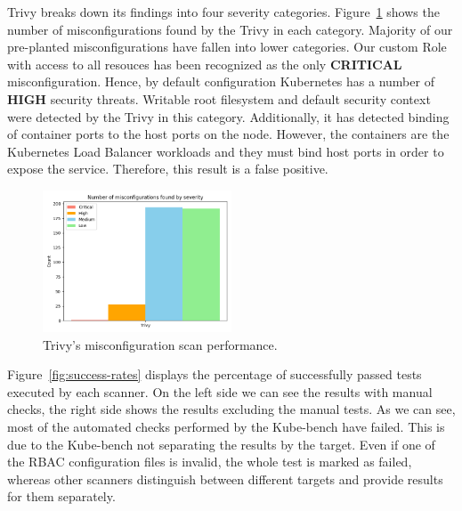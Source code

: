 
Trivy breaks down its findings into four severity categories. Figure~\ref{img:trivy-misconfigurations} shows the number of misconfigurations found by the Trivy in each category. Majority of our pre-planted misconfigurations have fallen into lower categories. Our custom Role with access to all resouces has been recognized as the only \textbf{CRITICAL} misconfiguration. Hence, by default configuration Kubernetes has a number of \textbf{HIGH} security threats. Writable root filesystem and default security context were detected by the Trivy in this category. Additionally, it has detected binding of container ports to the host ports on the node. However, the containers are the Kubernetes Load Balancer workloads and they must bind host ports in order to expose the service. Therefore, this result is a false positive.

\begin{figure}[!hbt]
	\begin{center}
		\includegraphics[width=0.5\textwidth]{images/trivy-misconfigurations.png}
        \caption{Trivy's misconfiguration scan performance.}
		\label{img:trivy-misconfigurations}
	\end{center}
\end{figure}

Figure~\ref{fig:success-rates} displays the percentage of successfully passed tests executed by each scanner. On the left side we can see the results with manual checks, the right side shows the results excluding the manual tests. As we can see, most of the automated checks performed by the Kube-bench have failed. This is due to the Kube-bench not separating the results by the target. Even if one of the RBAC configuration files is invalid, the whole test is marked as failed, whereas other scanners distinguish between different targets and provide results for them separately. 

